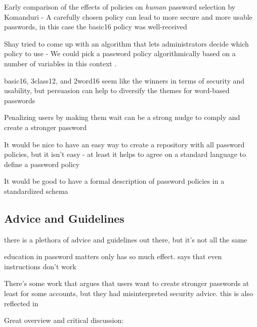 	\cite{Horsch2016PasswordPolicyMarkup}
	
	\cite{Chiasson2015QuantifyingExpiration}
	\cite{Blocki2013OptimizingPasswordPolicies}
	
	Early comparison of the effects of policies on \textit{human} password selection by Komanduri \etal - A carefully chosen policy can lead to more secure and more usable passwords, in this case the basic16 policy was well-received \cite{Komanduri2011OfPasswordsAndPeople}
	
	
	Shay tried to come up with an algorithm that lets administrators decide which policy to use - We could pick a password policy algorithmically based on a number of variables in this context \cite{Shay2009PolicySimulation}.
	
	basic16, 3class12, and 2word16 seem like the winners in terms of security and usability, but persuasion can help to diversify the themes for word-based passwords \cite{Shay2014CanLongPasswordsBeSecureAndUsable}
	
	
	Penalizing users by making them wait can be a strong nudge to comply and create a stronger password \cite{Malkin2013Waiting}
	
	It would be nice to have an easy way to create a repository with all password policies, but it isn't easy - at least it helps to agree on a standard language to define a password policy \cite{Steves2015PasswordPolicyLanguage}
	
	It would be good to have a formal description of password policies in a standardized schema \cite{Horsch2016PasswordPolicyMarkup}

	\subsection{Advice and Guidelines}\label{sec:rw:advice_guidance}
	
	there is a plethora of advice and guidelines out there, but it's not all the same 
	
	education in password matters only has so much effect. 
	\cite{Forget2007HelpingUsers} says that even instructions don't work
	
	There's some work that argues that users want to create stronger passwords at least for some accounts, but they had
	misinterpreted security advice. 
	this is also reflected in \cite{Ur2016PerceptionsPassword}
	
	Great overview and critical discussion: \cite{ZhangKennedy2016RevisitingPasswordRules}
	
